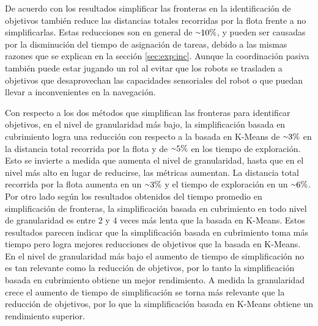De acuerdo con los resultados simplificar las fronteras en la identificación de
objetivos también reduce las distancias totales recorridas por la flota frente
a no simplificarlas. Estas reducciones son en general de ${\smallsim}10\%$, y
pueden ser causadas por la disminución del tiempo de asignación de tareas,
debido a las mismas razones que se explican en la sección \ref{sec:exp:inc}.
Aunque la coordinación pasiva también puede estar jugando un rol al evitar que
los robots se trasladen a objetivos que desaprovechan las capacidades
sensoriales del robot o que puedan llevar a inconvenientes en la navegación.

Con respecto a los dos métodos que simplifican las fronteras para 
identificar objetivos, en el nivel de granularidad más bajo, la
simplificación basada en cubrimiento logra una reducción con respecto a la
basada en K-Means de ${\smallsim}3\%$ en la distancia total recorrida por la
flota y de ${\smallsim}5\%$ en los tiempo de exploración. Esto se invierte a
medida que aumenta el nivel de granularidad, hasta que en el nivel más alto en
lugar de reducirse, las métricas aumentan. La distancia total recorrida por la
flota aumenta en un ${\smallsim}3\%$ y el tiempo de exploración en un
${\smallsim}6\%$. Por otro lado según los resultados obtenidos del tiempo
promedio en simplificación de fronteras, la simplificación basada en
cubrimiento en todo nivel de granularidad es entre $2$ y
$4$ veces más lenta que la basada en K-Means. Estos resultados
parecen indicar que la simplificación basada en cubrimiento toma más tiempo
pero logra mejores reducciones de objetivos que la basada en K-Means. En el
nivel de granularidad más bajo el aumento de tiempo de simplificación no es tan
relevante como la reducción de objetivos, por lo tanto la simplificación basada
en cubrimiento obtiene un mejor rendimiento. A medida la granularidad crece el
aumento de tiempo de simplificación se torna más relevante que la reducción de
objetivos, por lo que la simplificación basada en K-Means obtiene un
rendimiento superior.  



